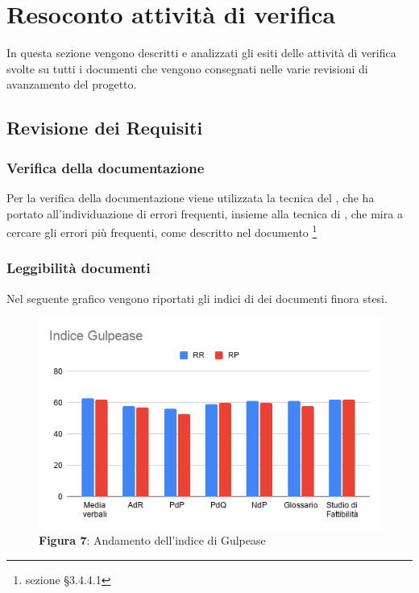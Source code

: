 \section{Resoconto attività di verifica}
In questa sezione vengono descritti e analizzati gli esiti delle attività di verifica svolte su tutti i documenti che vengono consegnati nelle varie revisioni di avanzamento del progetto.
	\subsection{Revisione dei Requisiti}
		\subsubsection{Verifica della documentazione}
		Per la verifica della documentazione viene utilizzata la tecnica del , che ha portato all'individuazione di errori frequenti, insieme alla tecnica di , che mira a cercare gli errori più frequenti, come descritto nel documento \footnote{sezione §3.4.4.1}
		\subsubsection{Leggibilità documenti}
		Nel seguente grafico vengono riportati gli indici di  dei documenti finora stesi.
		\begin{figure}[H]
			\centering
			\includegraphics[width=0.7\linewidth]{res/images/IndiceGulpease.png}
			\caption*{\textbf{Figura 7}: Andamento dell'indice di Gulpease}
			\label{fig:Figura1}
		\end{figure}